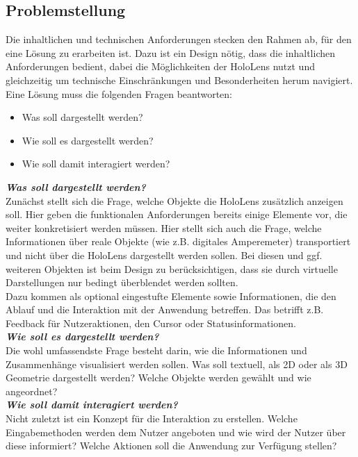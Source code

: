 \subsection{Problemstellung}
\label{sec-3-2}
Die inhaltlichen und technischen Anforderungen stecken den Rahmen ab, für den eine Lösung zu erarbeiten ist. Dazu ist ein Design nötig, dass die inhaltlichen Anforderungen bedient, dabei die Möglichkeiten der HoloLens nutzt und gleichzeitig um technische Einschränkungen und Besonderheiten herum navigiert.\\

Eine Lösung muss die folgenden Fragen beantworten:
\begin{itemize}
	\setlength{\itemsep}{-5pt}
	\item Was soll dargestellt werden? %
	\item Wie soll es dargestellt werden?
	\item Wie soll damit interagiert werden?
\end{itemize}

\textbf{\textit{Was soll dargestellt werden?}}\\
Zunächst stellt sich die Frage, welche Objekte die HoloLens zusätzlich anzeigen soll. Hier geben die funktionalen Anforderungen bereits einige Elemente vor, die weiter konkretisiert werden müssen. Hier stellt sich auch die Frage, welche Informationen über reale Objekte (wie z.B. digitales Amperemeter) transportiert und nicht über die HoloLens dargestellt werden sollen. Bei diesen und ggf. weiteren Objekten ist beim Design zu berücksichtigen, dass sie durch virtuelle Darstellungen nur bedingt überblendet werden sollten.\\

Dazu kommen als optional eingestufte Elemente sowie Informationen, die den Ablauf und die Interaktion mit der Anwendung betreffen. Das betrifft z.B. Feedback für Nutzeraktionen, den Cursor oder Statusinformationen.\\

\textbf{\textit{Wie soll es dargestellt werden?}}\\
Die wohl umfassendste Frage besteht darin, wie die Informationen und Zusammenhänge visualisiert werden sollen. Was soll textuell, als 2D oder als 3D Geometrie dargestellt werden? Welche Objekte werden gewählt und wie angeordnet?\\

\textbf{\textit{Wie soll damit interagiert werden?}}\\
Nicht zuletzt ist ein Konzept für die Interaktion zu erstellen. Welche Eingabemethoden werden dem Nutzer angeboten und wie wird der Nutzer über diese informiert? Welche Aktionen soll die Anwendung zur Verfügung stellen?\\

